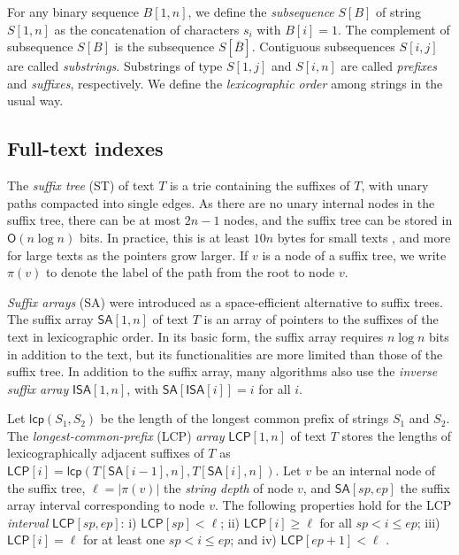 \documentclass[a4paper,11pt]{llncs}
\newcommand{\abs}[1]{\ensuremath{\lvert #1 \rvert}}
\renewcommand{\complement}[1]{\ensuremath{\overline{ #1 }}}
\newcommand{\ST}{\textsf{ST}}
\newcommand{\SA}{\textsf{SA}}
\newcommand{\mSA}{\ensuremath{\mathsf{SA}}}
\newcommand{\mISA}{\ensuremath{\mathsf{ISA}}}
\newcommand{\LCP}{\textsf{LCP}}
\newcommand{\mLCP}{\ensuremath{\mathsf{LCP}}}
\newcommand{\mlcp}{\ensuremath{\mathsf{lcp}}}
\newcommand{\Oh}{\ensuremath{\mathsf{O}}}
\begin{document}
For any binary sequence $B[1,n]$, we define the \emph{subsequence} $S[B]$ of string $S[1,n]$ as the concatenation of characters $s_{i}$ with $B[i] = 1$. The complement of subsequence $S[B]$ is the subsequence $S[\complement{B}]$. Contiguous subsequences $S[i,j]$ are called \emph{substrings}. Substrings of type $S[1,j]$ and $S[i,n]$ are called \emph{prefixes} and \emph{suffixes}, respectively. We define the \emph{lexicographic order} among strings in the usual way.

\subsection{Full-text indexes}

The \emph{suffix tree} (\ST) \cite{Weiner1973} of text $T$ is a trie containing the suffixes of $T$, with unary paths compacted into single edges. As there are no unary internal nodes in the suffix tree, there can be at most $2n-1$ nodes, and the suffix tree can be stored in $\Oh(n \log n)$ bits. In practice, this is at least $10n$ bytes for small texts \cite{Kurtz1999}, and more for large texts as the pointers grow larger. If $v$ is a node of a suffix tree, we write $\pi(v)$ to denote the label of the path from the root to node $v$.

\emph{Suffix arrays} (\SA) \cite{Manber1993} were introduced as a space-efficient alternative to suffix trees. The suffix array $\mSA[1,n]$ of text $T$ is an array of pointers to the suffixes of the text in lexicographic order. In its basic form, the suffix array requires $n \log n$ bits in addition to the text, but its functionalities are more limited than those of the suffix tree. In addition to the suffix array, many algorithms also use the \emph{inverse suffix array} $\mISA[1,n]$, with $\mSA[\mISA[i]] = i$ for all $i$.

Let $\mlcp(S_{1}, S_{2})$ be the length of the longest common prefix of strings $S_{1}$ and $S_{2}$. The \emph{longest-common-prefix} (\LCP) \emph{array} \cite{Manber1993} $\mLCP[1,n]$ of text $T$ stores the lengths of lexicographically adjacent suffixes of $T$ as $\mLCP[i] = \mlcp(T[\mSA[i-1],n], T[\mSA[i],n])$. Let $v$ be an internal node of the suffix tree, $\ell = \abs{\pi(v)}$ the \emph{string depth} of node $v$, and $\mSA[sp,ep]$ the suffix array interval corresponding to node $v$. The following properties hold for the \LCP{} \emph{interval} $\mLCP[sp,ep]$: i) $\mLCP[sp] < \ell$; ii) $\mLCP[i] \ge \ell$ for all $sp < i \le ep$; iii) $\mLCP[i] = \ell$ for at least one $sp < i \le ep$; and iv) $\mLCP[ep+1] < \ell$ \cite{Abouelhoda2004}.
\end{document}
